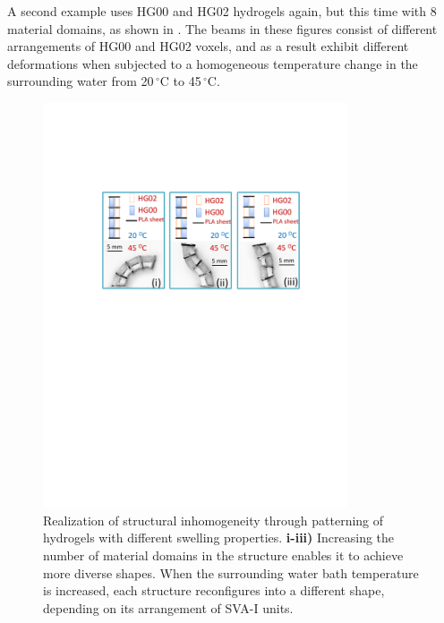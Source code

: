 A second example uses HG00 and HG02 hydrogels again, but this time with 
8 material domains, as shown in . The beams in these figures consist of different arrangements of HG00 and HG02 voxels, and as a result exhibit different deformations when subjected to a homogeneous temperature change in the surrounding water from 20\,$^{\circ}$C to 45\,$^{\circ}$C.\\
\begin{figure}[!ht]
\centering
\includegraphics[width=0.8\textwidth]{hardcoded.pdf}
\caption[]{Realization of structural inhomogeneity through patterning of hydrogels with different swelling properties. \textbf{i-iii)} Increasing the number of material domains in the structure enables it to achieve more diverse shapes. When the surrounding water bath temperature is increased, each structure reconfigures into a different shape, depending on its arrangement of SVA-I units.}
\label{fig:hardcoded}
\end{figure}

